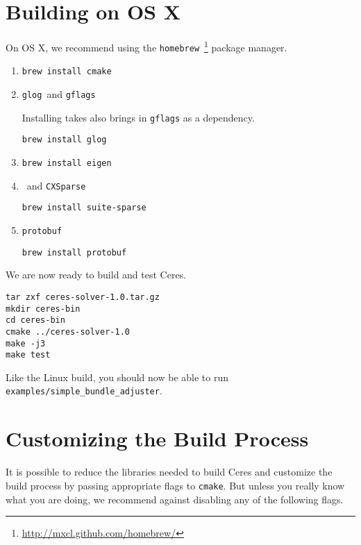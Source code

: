 \section{Building on OS X}
On OS X, we recommend using the \texttt{homebrew}~\footnote{\url{http://mxcl.github.com/homebrew/}} package manager.

\begin{enumerate}
\item{\cmake}
\begin{verbatim}
brew install cmake
\end{verbatim}
\item{\texttt{glog}\ and \texttt{gflags}}

Installing \texttt{\glog} takes also brings in \texttt{gflags} as a dependency.
\begin{verbatim}
brew install glog
\end{verbatim}
\item{\eigen}
\begin{verbatim}
brew install eigen
\end{verbatim}
\item{\suitesparse\ and \texttt{CXSparse}}
\begin{verbatim}
brew install suite-sparse
\end{verbatim}
\item{\texttt{protobuf}}
\begin{verbatim}
brew install protobuf
\end{verbatim}
\end{enumerate}

We are now ready to build and test Ceres.
\begin{verbatim}
tar zxf ceres-solver-1.0.tar.gz
mkdir ceres-bin
cd ceres-bin
cmake ../ceres-solver-1.0
make -j3
make test
\end{verbatim}
Like the Linux build, you should now be able to run \texttt{examples/simple\_bundle\_adjuster}.
\section{Customizing the Build Process}
\label{sec:custom}
It is possible to reduce the libraries needed to build Ceres and
customize the build process by passing appropriate flags to \texttt{cmake}. But unless you really know what you are
doing, we recommend against disabling any of the following flags.

